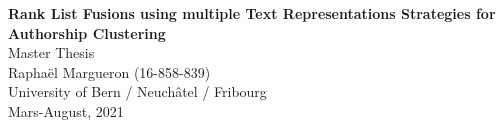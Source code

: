 \begin{titlepage}
  \vspace*{\fill}
  \begin{center}
    {\LARGE \textbf{Rank List Fusions using multiple Text Representations Strategies for Authorship Clustering}}
    \\[0.5cm]
    {\large Master Thesis}
    \\[8.0cm]
    {\large Raphaël Margueron (16-858-839)}
    \\[0.5cm]
    {\large University of Bern / Neuchâtel / Fribourg}
    \\[0.5cm]
    {\large Mars-August, 2021}
    \\[0.5cm]
  \end{center}
  \vspace*{\fill}
\end{titlepage}
